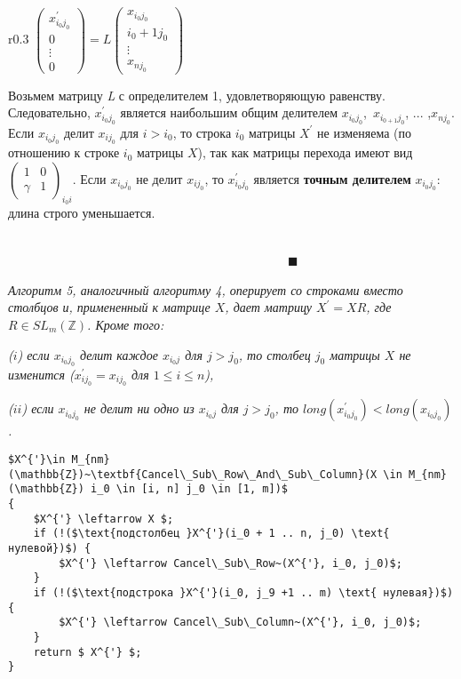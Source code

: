 \begin{leftbar}
\begin{wrapfigure}{r}{0.3\linewidth} $\begin{pmatrix} x^{'}_{i_0j_0}\\ 0\\ \vdots \\0 \end{pmatrix} = L \begin{pmatrix} x_{i_0j_0}\\ {i_0+1 j_0}\\ \vdots \\x_{nj_0} \end{pmatrix} $\end{wrapfigure} 
Возьмем матрицу \textit{L} с определителем 1, удовлетворяющую равенству. Следовательно, $x^{'}_{i_0j_0}$ является наибольшим общим делителем 
$x_{i_0 j_0}$,~$ x_{i_{0+1} j_0}$, ... ,$ x_{n j_0}$. Если $x_{i_0j_0}$ делит  $x_{i j_0}$ для $i > i_0$, то строка $i_0$ матрицы $X^{'}$ не изменяема (по отношению к строке $i_0$ матрицы $X$), так как матрицы перехода имеют вид$\begin{pmatrix} 
1 & 0 \\ \gamma & 1 \end{pmatrix}_{i_0 i} $. Если $x_{i_0 j_0}$ не делит $x_{i j_0}$, то $x_{i_0 j_0}^{'}$ является \textbf{точным делителем} $x_{i_0 j_0}$: длина строго уменьшается.\\
\end{leftbar}
~~~~~~~~~~~~~~~~~~~~~~~~~~~~~~~~~~~~~~~~~~~~~~~~~~~~~~~~~~~~~~~~~~~~~~~~~~~~~~~~~~~~~~~~~~~~~~~~~~~~~~~~~~~~~~~~~~~~~$\blacksquare$
\begin{lemma}
\hspace*{0.5cm}

\textit{Алгоритм 5, аналогичный алгоритму 4, оперирует со строками вместо столбцов и, примененный к матрице $X$, дает матрицу $X^{'} = X R$, где $R \in S L_m (\mathbb{Z})$. Кроме того:}

\textit{($i$) если $x_{i_0 j_0}$ делит каждое $x_{i_0 j}$ для $j > j_0$, то столбец $j_0$ матрицы $X$ не изменится ($x_{i j_0}^{'} = x_{i j_0}$ для $1 \leqslant i \leqslant n$),}

\textit{($ii$) если $x_{i_0 j_0}$ не делит ни одно из $x_{i_0 j}$ для $j > j_0$, то
$long(x_{i_0 j_0}^{'}) < long(x_{i_0 j_0})$.}
\begin{lstlisting}[mathescape=true]
$X^{'}\in M_{nm}(\mathbb{Z})~\textbf{Cancel\_Sub\_Row\_And\_Sub\_Column}(X \in M_{nm}(\mathbb{Z}) i_0 \in [i, n] j_0 \in [1, m])$ 
{
	$X^{'} \leftarrow X $;	
	if (!($\text{подстолбец }X^{'}(i_0 + 1 .. n, j_0) \text{ нулевой})$) {
		$X^{'} \leftarrow Cancel\_Sub\_Row~(X^{'}, i_0, j_0)$;	
	}
	if (!($\text{подстрока }X^{'}(i_0, j_9 +1 .. m) \text{ нулевая})$) {
		$X^{'} \leftarrow Cancel\_Sub\_Column~(X^{'}, i_0, j_0)$;	
	}
	return $ X^{'} $;
}
\end{lstlisting}
\end{lemma}
